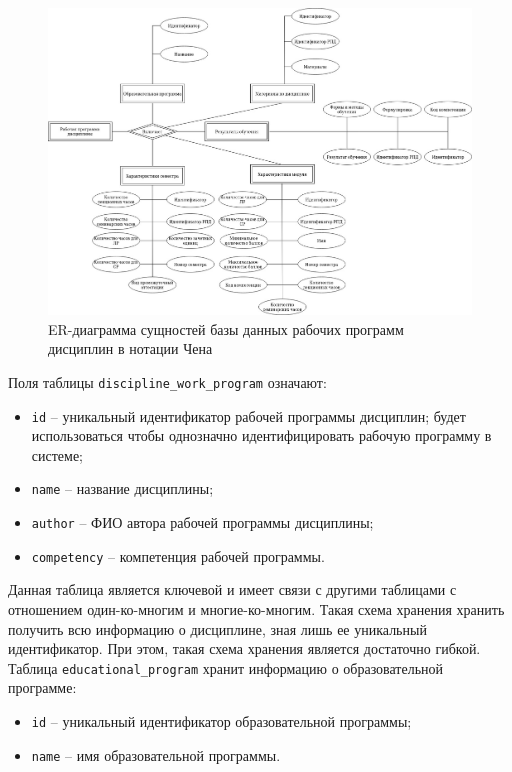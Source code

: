 \begin{figure}[h!]
	\begin{center}
		\includegraphics[scale=0.35]{img/er-chen.jpg}
	\end{center}
	\captionsetup{justification=centering}
	\caption{ER-диаграмма сущностей базы данных рабочих программ дисциплин в нотации Чена}
	\label{img:er-storage}
\end{figure}

Поля таблицы \texttt{discipline\_work\_program} означают:

\begin{itemize}
	\item \texttt{id} -- уникальный идентификатор рабочей программы дисциплин; будет использоваться чтобы однозначно идентифицировать рабочую программу в системе;
	\item \texttt{name} -- название дисциплины;
	\item \texttt{author} -- ФИО автора рабочей программы дисциплины; 
	\item \texttt{competency} -- компетенция рабочей программы.
\end{itemize}

Данная таблица является ключевой и имеет связи с другими таблицами с отношением один-ко-многим и многие-ко-многим. Такая схема хранения хранить получить всю информацию о дисциплине, зная лишь ее уникальный идентификатор. При этом, такая схема хранения является достаточно гибкой.\\

Таблица \texttt{educational\_program} хранит информацию о образовательной программе:

\begin{itemize}
	\item \texttt{id} -- уникальный идентификатор образовательной программы;
	\item \texttt{name} -- имя образовательной программы.
\end{itemize}
 
